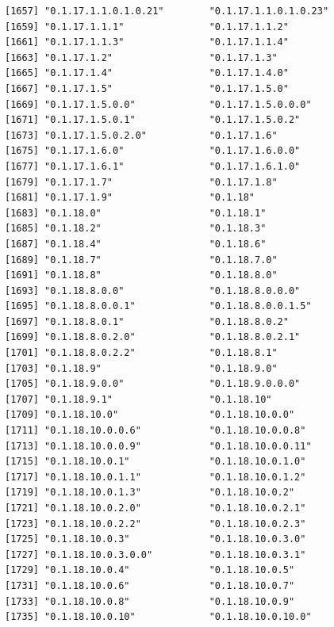 \documentclass[
  letterpaper,
  DIV=11,
  numbers=noendperiod]{scrreprt}
\begin{document}
\begin{verbatim}
[1657] "0.1.17.1.1.0.1.0.21"        "0.1.17.1.1.0.1.0.23"       
[1659] "0.1.17.1.1.1"               "0.1.17.1.1.2"              
[1661] "0.1.17.1.1.3"               "0.1.17.1.1.4"              
[1663] "0.1.17.1.2"                 "0.1.17.1.3"                
[1665] "0.1.17.1.4"                 "0.1.17.1.4.0"              
[1667] "0.1.17.1.5"                 "0.1.17.1.5.0"              
[1669] "0.1.17.1.5.0.0"             "0.1.17.1.5.0.0.0"          
[1671] "0.1.17.1.5.0.1"             "0.1.17.1.5.0.2"            
[1673] "0.1.17.1.5.0.2.0"           "0.1.17.1.6"                
[1675] "0.1.17.1.6.0"               "0.1.17.1.6.0.0"            
[1677] "0.1.17.1.6.1"               "0.1.17.1.6.1.0"            
[1679] "0.1.17.1.7"                 "0.1.17.1.8"                
[1681] "0.1.17.1.9"                 "0.1.18"                    
[1683] "0.1.18.0"                   "0.1.18.1"                  
[1685] "0.1.18.2"                   "0.1.18.3"                  
[1687] "0.1.18.4"                   "0.1.18.6"                  
[1689] "0.1.18.7"                   "0.1.18.7.0"                
[1691] "0.1.18.8"                   "0.1.18.8.0"                
[1693] "0.1.18.8.0.0"               "0.1.18.8.0.0.0"            
[1695] "0.1.18.8.0.0.1"             "0.1.18.8.0.0.1.5"          
[1697] "0.1.18.8.0.1"               "0.1.18.8.0.2"              
[1699] "0.1.18.8.0.2.0"             "0.1.18.8.0.2.1"            
[1701] "0.1.18.8.0.2.2"             "0.1.18.8.1"                
[1703] "0.1.18.9"                   "0.1.18.9.0"                
[1705] "0.1.18.9.0.0"               "0.1.18.9.0.0.0"            
[1707] "0.1.18.9.1"                 "0.1.18.10"                 
[1709] "0.1.18.10.0"                "0.1.18.10.0.0"             
[1711] "0.1.18.10.0.0.6"            "0.1.18.10.0.0.8"           
[1713] "0.1.18.10.0.0.9"            "0.1.18.10.0.0.11"          
[1715] "0.1.18.10.0.1"              "0.1.18.10.0.1.0"           
[1717] "0.1.18.10.0.1.1"            "0.1.18.10.0.1.2"           
[1719] "0.1.18.10.0.1.3"            "0.1.18.10.0.2"             
[1721] "0.1.18.10.0.2.0"            "0.1.18.10.0.2.1"           
[1723] "0.1.18.10.0.2.2"            "0.1.18.10.0.2.3"           
[1725] "0.1.18.10.0.3"              "0.1.18.10.0.3.0"           
[1727] "0.1.18.10.0.3.0.0"          "0.1.18.10.0.3.1"           
[1729] "0.1.18.10.0.4"              "0.1.18.10.0.5"             
[1731] "0.1.18.10.0.6"              "0.1.18.10.0.7"             
[1733] "0.1.18.10.0.8"              "0.1.18.10.0.9"             
[1735] "0.1.18.10.0.10"             "0.1.18.10.0.10.0"          

\end{verbatim}
\end{document}
